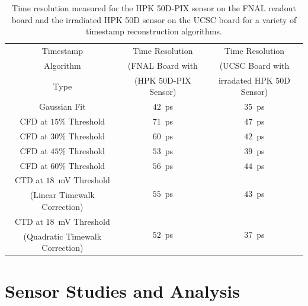 \documentclass[preprint,1p]{elsarticle}
\begin{document}
\begin{table}[!htb]
\scriptsize
\begin{center}
  \begin{tabular}{ |c | c | c | }
    \hline
    Timestamp   & Time Resolution   & Time Resolution   \\ 
    Algorithm   & (FNAL Board with  & (UCSC Board with   \\ 
    Type        & (HPK 50D-PIX Sensor)  & irradated HPK 50D Sensor)  \\ \hline 
    Gaussian Fit & $42$~ps & $35$~ps \\ \hline       
    CFD at $15\%$ Threshold & $71$~ps & $47$~ps \\       
    CFD at $30\%$ Threshold & $60$~ps & $42$~ps \\       
    CFD at $45\%$ Threshold & $53$~ps & $39$~ps \\       
    CFD at $60\%$ Threshold & $56$~ps & $44$~ps \\   \hline     
    CTD at $18$~mV Threshold & \multirow{2}{*}{$55$~ps} & \multirow{2}{*}{$43$~ps} \\       
    (Linear Timewalk Correction) & &  \\       
    CTD at $18$~mV Threshold & \multirow{2}{*}{$52$~ps} & \multirow{2}{*}{$37$~ps} \\       
    (Quadratic Timewalk Correction) & &  \\       
    \hline
  \end{tabular}
\caption{Time resolution measured for the HPK 50D-PIX sensor on the FNAL readout board
and the irradiated HPK 50D sensor on the UCSC board for a variety of timestamp reconstruction
algorithms.}  
\label{tab:FNALUCSCBoardTimestampRecoStudy}
\end{center}
\end{table}




\section{Sensor Studies and Analysis}
\label{sec:results}
\end{document}
